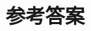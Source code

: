 \documentclass[10pt,twoside,fleqn]{ctexart}
\begin{document}








\newpage
\showanswers
\section*{参考答案}
\begin{enumerate}
\foreachdataset{\thisdataset}{%
\foreachproblem[\thisdataset]{\item[\ref{prob:\thisproblemlabel}]\thisproblem}}
\end{enumerate}





\end{document}
